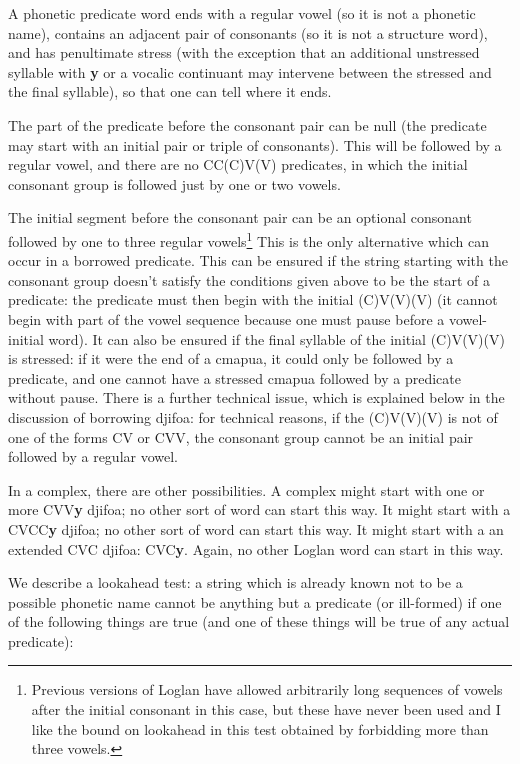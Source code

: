 \documentclass[12pt]{book}
\begin{document}
{A phonetic predicate word ends with a regular vowel (so it is not a phonetic name), contains an adjacent pair of consonants (so it is not a structure word), and has
penultimate stress (with the exception that an additional unstressed syllable with {\bf y} or a vocalic continuant may intervene between the stressed and the final syllable), so that one can tell where it ends.

The part of the predicate before the consonant pair can be null (the predicate may start with an initial pair or triple of consonants).  This will be followed by a regular vowel,
and there are no CC(C)V(V) predicates, in which the initial consonant group is followed just by one or two vowels.

The initial segment before the consonant pair can be an optional consonant followed by one to three regular vowels\footnote{Previous versions of Loglan have allowed arbitrarily long sequences of vowels after the initial consonant in this case, but these have never been used and I like the bound on lookahead in this test obtained by forbidding more than three vowels.}   This is the only alternative which can occur in a borrowed predicate.  This can be ensured if the string starting with the consonant group doesn't satisfy the conditions given above to be the start of a predicate:  the predicate must then begin with the initial (C)V(V)(V) (it cannot begin with part of the vowel sequence because one must pause before a vowel-initial word).  It can also be ensured if the final syllable of the initial (C)V(V)(V) is stressed:  if it were the end of a cmapua, it could only be followed by a predicate,
and one cannot have a stressed cmapua followed by a predicate without pause.  There is a further technical issue, which is explained below in the discussion of borrowing djifoa:
for technical reasons, if the (C)V(V)(V) is not of one of the forms CV or CVV, the consonant group cannot be an initial pair followed by a regular vowel.

In a complex, there are other possibilities.  A complex might start with one or more CVV{\bf y} djifoa; no other sort of word can start this way.  It might start with
a CVCC{\bf y} djifoa;  no other sort of word can start this way.  It might start with a an extended CVC djifoa:  CVC{\bf y}. Again, no other Loglan word can start in this way.

We describe a  lookahead test:  a string which is already known not to be a possible phonetic name cannot be anything but a predicate (or ill-formed) if one of the following things are true (and one of these things will be true of any actual predicate):

}
\end{document}

